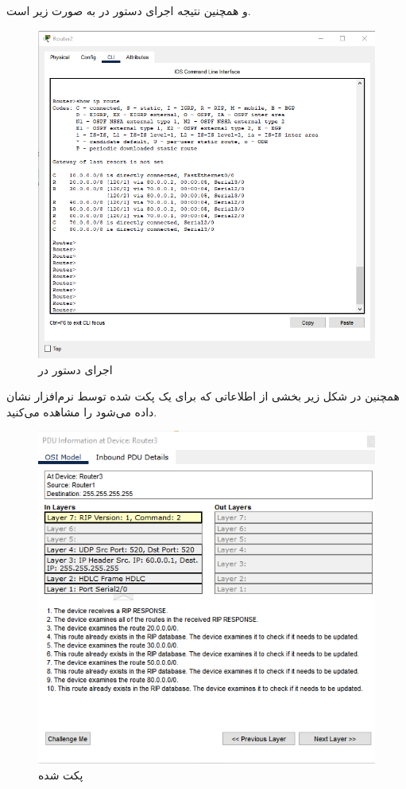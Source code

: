 \documentclass[12pt]{article}
\begin{document}
و همچنین نتیجه اجرای دستور
در  به صورت زیر است.

\begin{figure}[H]
	\centering
	\includegraphics[scale=0.4]{images/rip/10.png}
	\caption{اجرای دستور  در } 
	\label{showiprip2}
\end{figure}

همچنین در شکل زیر بخشی از اطلاعاتی که برای یک پکت  شده  توسط نرم‌افزار نشان داده می‌شود را مشاهده می‌کنید.

\begin{figure}[H]
	\centering
	\includegraphics[scale=0.4]{images/rip/RipSniff.png}
	\caption{پکت  شده } 
	\label{ripsniff}
\end{figure}
\end{document}
